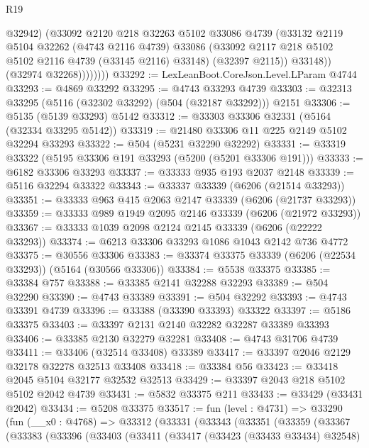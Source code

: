 \begin{lexlean}{R19}
\begin{coremodule}
{{{{{{{{{{{                      @32942)
                    (@33092
                      @2120
                      @218
                      @32263
                      @5102
                      @33086
                      @4739
                      (@33132
                        @2119
                        @5104
                        @32262
                        (@4743 @2116 @4739)
                        @33086
                        (@33092 @2117 @218 @5102 @5102 @2116 @4739 (@33145 @2116) @33148)
                        (@32397 @2115))
                      @33148))
                  (@32974 @32268))))))))
@33292 := LexLeanBoot.CoreJson.Level.LParam @4744
@33293 := @4869 @33292
@33295 := @4743 @33293 @4739
@33303 := @32313 @33295 (@5116 (@32302 @33292) (@504 (@32187 @33292))) @2151
@33306 := @5135 (@5139 @33293) @5142
@33312 := @33303 @33306 @32331 (@5164 (@32334 @33295 @5142))
@33319 := @21480 @33306 @11 @225 @2149 @5102 @32294 @33293
@33322 := @504 (@5231 @32290 @32292)
@33331 := @33319 @33322 (@5195 @33306 @191 @33293 (@5200 (@5201 @33306 @191)))
@33333 := @6182 @33306 @33293
@33337 := @33333 @935 @193 @2037 @2148
@33339 := @5116 @32294 @33322
@33343 := @33337 @33339 (@6206 (@21514 @33293))
@33351 := @33333 @963 @415 @2063 @2147 @33339 (@6206 (@21737 @33293))
@33359 := @33333 @989 @1949 @2095 @2146 @33339 (@6206 (@21972 @33293))
@33367 := @33333 @1039 @2098 @2124 @2145 @33339 (@6206 (@22222 @33293))
@33374 := @6213 @33306 @33293 @1086 @1043 @2142 @736 @4772
@33375 := @30556 @33306
@33383 := @33374 @33375 @33339 (@6206 (@22534 @33293)) (@5164 (@30566 @33306))
@33384 := @5538 @33375
@33385 := @33384 @757
@33388 := @33385 @2141 @32288 @32293
@33389 := @504 @32290
@33390 := @4743 @33389
@33391 := @504 @32292
@33393 := @4743 @33391 @4739
@33396 := @33388 (@33390 @33393) @33322
@33397 := @5186 @33375
@33403 := @33397 @2131 @2140 @32282 @32287 @33389 @33393
@33406 := @33385 @2130 @32279 @32281
@33408 := @4743 @31706 @4739
@33411 := @33406 (@32514 @33408) @33389
@33417 := @33397 @2046 @2129 @32178 @32278 @32513 @33408
@33418 := @33384 @56
@33423 := @33418 @2045 @5104 @32177 @32532 @32513
@33429 := @33397 @2043 @218 @5102 @5102 @2042 @4739
@33431 := @5832 @33375 @211
@33433 := @33429 (@33431 @2042)
@33434 := @5208 @33375
@33517 := fun (level : @4731) =>
  @33290
    (fun (__x0 : @4768) =>
    @33312
      (@33331
        (@33343
          (@33351
            (@33359
              (@33367
                (@33383
                  (@33396
                    (@33403
                      (@33411
                        (@33417
                          (@33423 (@33433 @33434) @32548)
}}}}}}}}}}}
\end{coremodule}
\end{lexlean}

